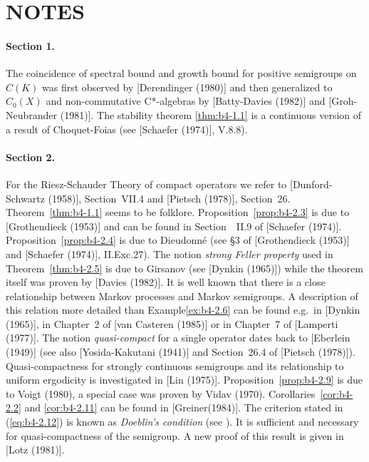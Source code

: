 \section*{NOTES}

\paragraph{Section 1.} The coincidence of spectral bound and growth bound for positive semigroups on $C(K)$ was first observed by [Derendinger (1980)] and then generalized to $C_0(X)$ and non-commutative C*-algebras by [Batty-Davies (1982)] and [Groh-Neubrander (1981)]. The stability theorem \ref{thm:b4-1.1} is a continuous version of a result of Choquet-Foias (see [Schaefer (1974)], V.8.8).

\paragraph{Section 2.} For the Riesz-Schauder Theory of compact operators we refer to [Dunford-Schwartz (1958)], Section~VII.4 and [Pietsch (1978)], Section~26. 
Theorem~\ref{thm:b4-1.1} seems to be folklore. Proposition~\ref{prop:b4-2.3} is due to [Grothendieck (1953)] and can be found in Section~~II.9 of [Schaefer (1974)]. Proposition~\ref{prop:b4-2.4} is due to Dieudonné (see §3 of [Grothendieck (1953)] and [Schaefer (1974)], II.Exc.27). The notion \emph{strong Feller property} used in Theorem~\ref{thm:b4-2.5} is due to Girsanov (see [Dynkin (1965)]) while the theorem itself was proven by [Davies (1982)]. It is well known that there is a close relationship between Markov processes and Markov semigroups. A description of this relation more detailed than Example\ref{ex:b4-2.6} can be found e.g.\ in [Dynkin (1965)], in Chapter~2 of [van Casteren (1985)] or in Chapter~7 of [Lamperti (1977)]. The notion \emph{quasi-compact} for a single operator dates back to [Eberlein (1949)] (see also [Yosida-Kakutani (1941)] and Section~26.4 of [Pietsch (1978)]). Quasi-compactness for strongly continuous semigroups and its relationship to uniform ergodicity is investigated in [Lin (1975)]. Proposition~\ref{prop:b4-2.9} is due to Voigt (1980), a special case was proven by Vidav (1970). Corollaries~\ref{cor:b4-2.2} and \ref{cor:b4-2.11} can be found in [Greiner(1984)]. The criterion stated in (\ref{eq:b4-2.12}) is known as \emph{Doeblin's condition} (see ). It is sufficient and
%
\newpage
%
necessary for quasi-compactness of the semigroup. A new proof of this result is given in [Lotz (1981)].

